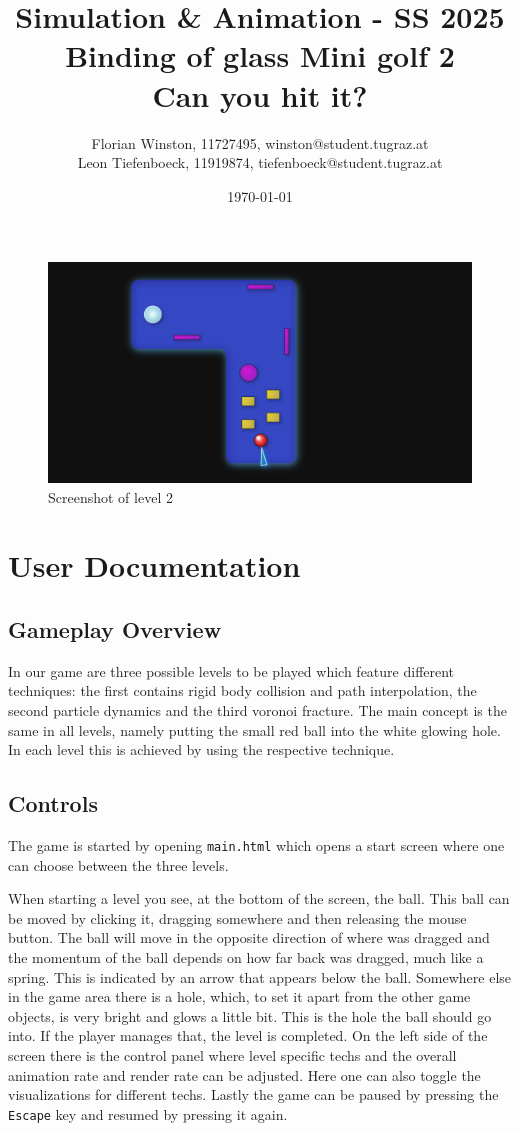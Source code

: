 \documentclass{article}
\title{	
	\large Simulation \& Animation - SS 2025\\
	\Huge{Binding of glass Mini golf 2}\\
	\huge{Can you hit it?}
}
\author{\parbox{\textwidth}{\centering
	Florian Winston, 11727495, winston@student.tugraz.at\\%
	Leon Tiefenboeck, 11919874, tiefenboeck@student.tugraz.at\\%
}}
\date{\today}
\begin{document}
\maketitle

\begin{figure}[H]
    \includegraphics[width=\textwidth]{showcase.png}
    \caption{Screenshot of level 2}
\end{figure}

\section{User Documentation}

\subsection{Gameplay Overview}

In our game are three possible levels to be played which feature different techniques: the first contains rigid body collision and path interpolation, the second particle dynamics and the third voronoi fracture. 
The main concept is the same in all levels, namely putting the small red ball into the white glowing hole. 
In each level this is achieved by using the respective technique.

\subsection{Controls}

The game is started by opening \texttt{main.html} which opens a 
start screen where one can choose between the three levels. 

When starting a level you see, at the bottom of the screen, the ball. This ball can be moved 
by clicking it, dragging somewhere and then releasing the mouse button. 
The ball will move in the opposite direction of where was dragged and the momentum of the 
ball depends on how far back was dragged, much like a spring. This is indicated by an arrow that appears below the ball.
Somewhere else in the game area there is a hole, which, to set it apart from the other game objects, 
is very bright and glows a little bit. This is the hole 
the ball should go into. If the player manages that, the level is completed.
On the left side of the screen there is the control panel where level specific techs 
and the overall animation rate and render rate can be adjusted. Here one can also toggle the visualizations 
for different techs. 
Lastly the game can be paused by pressing the \texttt{Escape} key and resumed by pressing it again.
\end{document}
